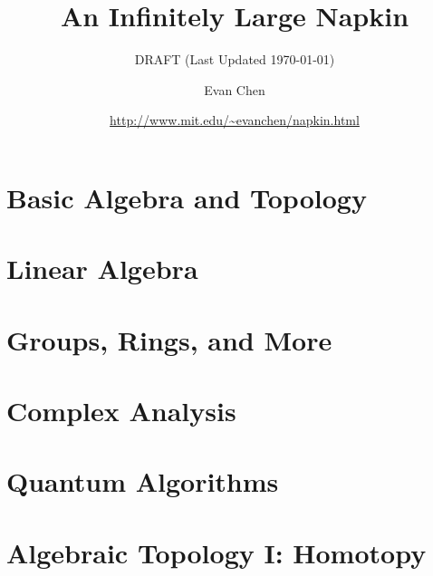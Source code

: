 \documentclass[11pt,numbers=noenddot]{scrreprt}
\begin{document}
\doparttoc[n]

\title{An Infinitely Large Napkin}
\subtitle{DRAFT (Last Updated \today)}
\author{Evan Chen}
\date{\url{http://www.mit.edu/~evanchen/napkin.html}}
\maketitle




\tableofcontents



\part{Basic Algebra and Topology}






\part{Linear Algebra}





\part{Groups, Rings, and More}





\part{Complex Analysis}



%

\part{Quantum Algorithms}



\part{Algebraic Topology I: Homotopy}


\end{document}
